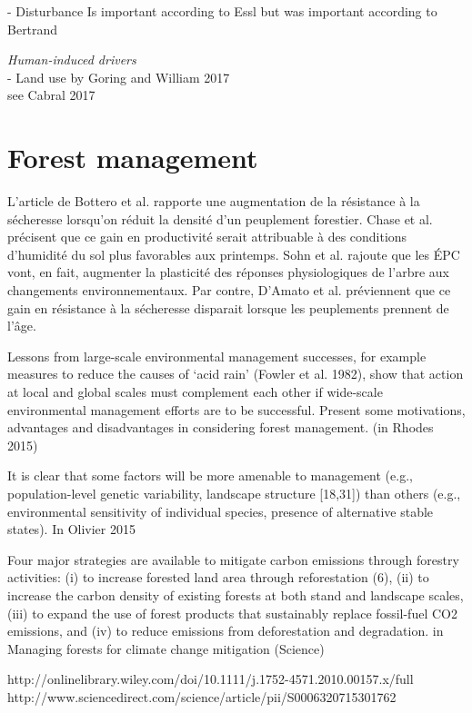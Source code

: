 - Disturbance
Is important according to Essl but was important according to Bertrand

\textit{Human-induced drivers} \\
- Land use by Goring and William 2017 \\
see Cabral 2017

\section{Forest management}

 L’article de Bottero et al. rapporte une augmentation de la résistance à la sécheresse lorsqu’on réduit la densité d’un peuplement forestier. Chase et al. précisent que ce gain en productivité serait attribuable à des conditions d’humidité du sol plus favorables aux printemps.  Sohn et al. rajoute que les ÉPC vont, en fait, augmenter la plasticité des réponses physiologiques de l’arbre aux changements environnementaux.  Par contre, D’Amato et al. préviennent que ce gain en résistance à la sécheresse disparait lorsque les peuplements prennent de l’âge.

Lessons from large-scale environmental management successes, for example measures to reduce the causes of ‘acid rain’ (Fowler et al. 1982), show that action at local and global scales must complement each other if wide-scale environmental management efforts are to be successful.
Present some motivations, advantages and disadvantages in considering forest management. (in Rhodes 2015)

It is clear that some factors will be more amenable to management (e.g., population-level genetic variability, landscape structure
[18,31]) than others (e.g., environmental sensitivity of individual species, presence of alternative stable states). In Olivier 2015

Four major strategies are available to mitigate carbon emissions through forestry activities: (i) to increase forested land area through reforestation (6), (ii) to increase the carbon density of existing forests at both stand and landscape scales, (iii) to expand the use of forest products that sustainably replace fossil-fuel CO2 emissions, and (iv) to reduce emissions from deforestation and degradation. in Managing forests for climate change mitigation (Science)

http://onlinelibrary.wiley.com/doi/10.1111/j.1752-4571.2010.00157.x/full \\
http://www.sciencedirect.com/science/article/pii/S0006320715301762


